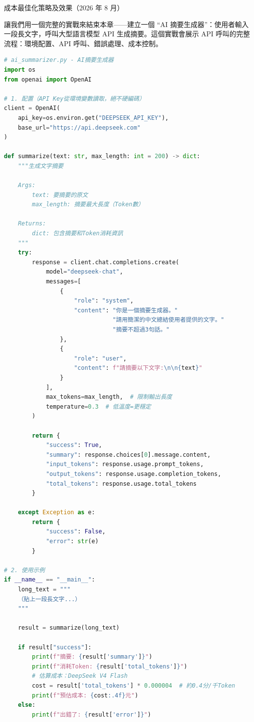 \begin{center}\small\color{gray}成本最佳化策略及效果（2026 年 8 月）\end{center}


讓我們用一個完整的實戰來結束本章——建立一個 “AI 摘要生成器”：使用者輸入一段長文字，呼叫大型語言模型 API 生成摘要。這個實戰會展示 API 呼叫的完整流程：環境配置、API 呼叫、錯誤處理、成本控制。

\begin{lstlisting}[language=Python]
# ai_summarizer.py - AI摘要生成器
import os
from openai import OpenAI

# 1. 配置（API Key從環境變數讀取，絕不硬編碼）
client = OpenAI(
    api_key=os.environ.get("DEEPSEEK_API_KEY"),
    base_url="https://api.deepseek.com"
)

def summarize(text: str, max_length: int = 200) -> dict:
    """生成文字摘要

    Args:
        text: 要摘要的原文
        max_length: 摘要最大長度（Token數）

    Returns:
        dict: 包含摘要和Token消耗資訊
    """
    try:
        response = client.chat.completions.create(
            model="deepseek-chat",
            messages=[
                {
                    "role": "system",
                    "content": "你是一個摘要生成器。"
                               "請用簡潔的中文總結使用者提供的文字。"
                               "摘要不超過3句話。"
                },
                {
                    "role": "user",
                    "content": f"請摘要以下文字:\n\n{text}"
                }
            ],
            max_tokens=max_length,  # 限制輸出長度
            temperature=0.3  # 低溫度=更穩定
        )

        return {
            "success": True,
            "summary": response.choices[0].message.content,
            "input_tokens": response.usage.prompt_tokens,
            "output_tokens": response.usage.completion_tokens,
            "total_tokens": response.usage.total_tokens
        }

    except Exception as e:
        return {
            "success": False,
            "error": str(e)
        }

# 2. 使用示例
if __name__ == "__main__":
    long_text = """
    （貼上一段長文字...）
    """

    result = summarize(long_text)

    if result["success"]:
        print(f"摘要: {result['summary']}")
        print(f"消耗Token: {result['total_tokens']}")
        # 估算成本：DeepSeek V4 Flash
        cost = result['total_tokens'] * 0.000004  # 約0.4分/千Token
        print(f"預估成本: {cost:.4f}元")
    else:
        print(f"出錯了: {result['error']}")
\end{lstlisting}

